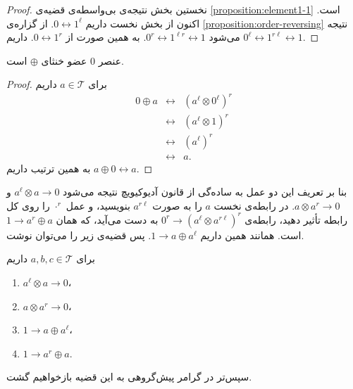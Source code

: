 \begin{proof}
نخستین بخش نتیجه‌ی بی‌واسطه‌ی قضیه‌ی
\ref{proposition:element1-1}
است.
اکنون از بخش نخست داریم
$0 \leftrightarrow 1^\ell$.
از گزاره‌ی
\ref{proposition:order-reversing}
نتیجه می‌شود
$0^r \leftrightarrow 1^{\ell r} \leftrightarrow 1$.
به همین صورت از
$0 \leftrightarrow 1^r$.
داریم
$0^\ell \leftrightarrow 1^{r \ell} \leftrightarrow 1$.
\end{proof}

\begin{theorem}
عنصر 
$0$
عضو خنثای 
$\oplus$
است.
\end{theorem}
\begin{proof}
برای
$a \in \mathcal{T}$
داریم
\begin{eqnarray}
0 \oplus a &\leftrightarrow& (a^\ell \otimes 0^\ell)^r \nonumber \\
&\leftrightarrow& (a^\ell \otimes 1)^r \nonumber \\
&\leftrightarrow& (a^\ell)^r \nonumber \\
&\leftrightarrow& a. \nonumber
\end{eqnarray}
به همین ترتیب داریم 
$a \oplus 0 \leftrightarrow a$.
\end{proof}

بنا بر تعریف این دو عمل به ساده‌گی از قانون آدیوکیویچ نتیجه می‌شود 
$a^\ell \otimes a \rightarrow 0$
و
$a \otimes a^r \rightarrow 0$.
در رابطه‌ی نخست 
$a$
را به صورت 
$a^{r \ell}$
بنویسید، و عمل 
$\cdot^r$
را روی کل رابطه تأثیر دهید، رابطه‌ی 
$0^r \rightarrow (a^\ell \otimes a^{r\ell})^r$
به دست می‌آید، که همان
$1 \rightarrow a^r \oplus a$
است.
همانند همین داریم 
$1 \rightarrow a \oplus a^\ell$.
پس قضیه‌ی زیر را می‌توان نوشت.

\begin{theorem}
\label{theorem:3-compact}
برای 
$a, b, c \in \mathcal{T}$
داریم
\begin{enumerate}
\item
$a^\ell \otimes a \rightarrow 0$،
\item
$a \otimes a^r \rightarrow 0$،
\item
$1 \rightarrow a \oplus a^\ell$،
\item
$1 \rightarrow a^r \oplus a$.
\end{enumerate}
\end{theorem}

سپس‌تر در گرامر پیش‌گروهی  به این قضیه بازخواهیم گشت.

